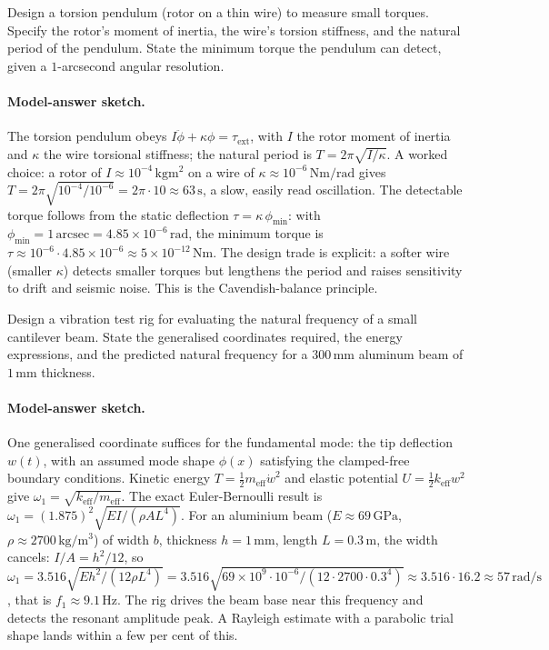 \begin{exercise}
Design a torsion pendulum (rotor on a thin wire) to measure small
torques. Specify the rotor's moment of inertia, the wire's torsion
stiffness, and the natural period of the pendulum. State the minimum
torque the pendulum can detect, given a $1$-arcsecond angular
resolution.

\paragraph{Model-answer sketch.} The torsion pendulum obeys $I\ddot
\phi + \kappa\phi = \tau_\text{ext}$, with $I$ the rotor moment of
inertia and $\kappa$ the wire torsional stiffness; the natural period is
$T = 2\pi\sqrt{I/\kappa}$. A worked choice: a rotor of $I \approx
10^{-4}\,\si{\kilogram\meter\squared}$ on a wire of $\kappa \approx
10^{-6}\,\si{\newton\meter\per\radian}$ gives $T = 2\pi\sqrt{10^{-4}/
10^{-6}} = 2\pi\cdot 10 \approx 63\,\si{\second}$, a slow, easily read
oscillation. The detectable torque follows from the static deflection
$\tau = \kappa\,\phi_\text{min}$: with $\phi_\text{min} =
1\,\text{arcsec} = 4.85\times 10^{-6}\,\si{\radian}$, the minimum torque
is $\tau \approx 10^{-6}\cdot 4.85\times 10^{-6} \approx 5\times
10^{-12}\,\si{\newton\meter}$. The design trade is explicit: a softer
wire (smaller $\kappa$) detects smaller torques but lengthens the period
and raises sensitivity to drift and seismic noise. This is the
Cavendish-balance principle.
\end{exercise}

\begin{exercise}
Design a vibration test rig for evaluating the natural frequency of
a small cantilever beam. State the generalised coordinates required,
the energy expressions, and the predicted natural frequency for a
$300\,\si{\milli\meter}$ aluminum beam of $1\,\si{\milli\meter}$
thickness.

\paragraph{Model-answer sketch.} One generalised coordinate suffices
for the fundamental mode: the tip deflection $w(t)$, with an assumed
mode shape $\phi(x)$ satisfying the clamped-free boundary conditions.
Kinetic energy $T = \tfrac12 m_\text{eff}\dot w^2$ and elastic potential
$U = \tfrac12 k_\text{eff} w^2$ give $\omega_1 = \sqrt{k_\text{eff}/
m_\text{eff}}$. The exact Euler-Bernoulli result is $\omega_1 =
(1.875)^2\sqrt{EI/(\rho A L^4)}$. For an aluminium beam ($E \approx
69\,\si{\giga\pascal}$, $\rho \approx 2700\,\si{\kilogram\per\meter
\cubed}$) of width $b$, thickness $h = 1\,\si{\milli\meter}$, length
$L = 0.3\,\si{\meter}$, the width cancels: $I/A = h^2/12$, so $\omega_1 =
3.516\sqrt{E h^2/(12\rho L^4)} = 3.516\sqrt{69\times 10^9\cdot 10^{-6}/
(12\cdot 2700\cdot 0.3^4)} \approx 3.516\cdot 16.2 \approx
57\,\si{\radian\per\second}$, that is $f_1 \approx 9.1\,\si{\hertz}$. The
rig drives the beam base near this frequency and detects the resonant
amplitude peak. A Rayleigh estimate with a parabolic trial shape lands
within a few per cent of this.
\end{exercise}


